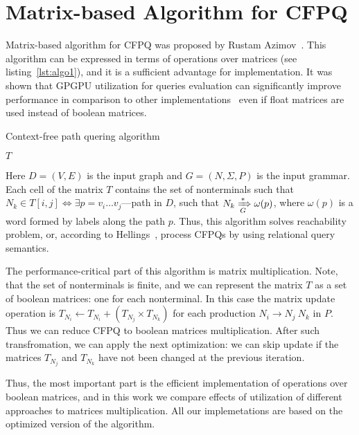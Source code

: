 \section{Matrix-based Algorithm for CFPQ}

Matrix-based algorithm for CFPQ was proposed by Rustam Azimov~\cite{Azimov:2018:CPQ:3210259.3210264}.
This algorithm can be expressed in terms of operations over matrices (see listing~\ref{lst:algo1}), and it is a sufficient advantage for implementation.
It was shown that GPGPU utilization for queries evaluation can significantly improve performance in comparison to other implementations~\cite{Azimov:2018:CPQ:3210259.3210264} even if float matrices are used instead of boolean matrices.

\begin{algorithm}
\begin{algorithmic}[1]
\caption{Context-free path quering algorithm}
\label{lst:algo1}

    \EndFor

    \EndWhile
\State \Return $T$
\EndFunction
\end{algorithmic}
\end{algorithm}

Here $D = (V, E)$ is the input graph and $G = (N,\Sigma,P)$ is the input grammar.
Each cell of the matrix $T$ contains the set of nonterminals such that $N_k \in T[i,j] \iff \exists p = v_i \ldots v_j $---path in $D$, such that $N_k \xRightarrow[G]{*} \omega(p) $, where $\omega(p)$ is a word formed by labels along the path $p$.
Thus, this algorithm solves reachability problem, or, according to Hellings~\cite{hellingsRelational}, process CFPQs by using relational query semantics.

The performance-critical part of this algorithm is matrix multiplication.
Note, that the set of nonterminals is finite, and we can represent the matrix $T$ as a set of boolean matrices: one for each nonterminal.
In this case the matrix update operation is $T_{N_i} \leftarrow T_{N_i} + (T_{N_j} \times T_{N_k})$ for each production $N_i \rightarrow N_j \ N_k$ in $P$.
Thus we can reduce CFPQ to boolean matrices multiplication.
After such transfromation, we can apply the next optimization: we can skip update if the matrices $T_{N_j}$ and $T_{N_k}$ have not been changed at the previous iteration.

Thus, the most important part is the efficient implementation of operations over boolean matrices, and in this work we compare effects of utilization of different approaches to matrices multiplication.
All our implemetations are based on the optimized version of the algorithm.
